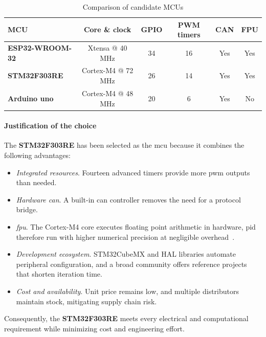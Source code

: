 \begin{table}[H]
  \centering
  \begin{tabular}{l c c c c c}
    \toprule
    \textbf{MCU}            &
    \textbf{Core \& clock}  &
    \textbf{GPIO}           &
    \textbf{PWM timers}     &
    \textbf{CAN}            &
    \textbf{FPU}                                                       \\
    \midrule
    \textbf{ESP32-WROOM-32} & Xtensa @ 40 MHz    & 34 & 16 & Yes & Yes \\
    \textbf{STM32F303RE}    & Cortex-M4 @ 72 MHz & 26 & 14 & Yes & Yes \\
    \textbf{Arduino uno}    & Cortex-M4 @ 48 MHz & 20 & 6  & Yes & No  \\
    \bottomrule
  \end{tabular}
  \caption{Comparison of candidate MCUs}
  \label{tab:mcu_comparison}
\end{table}

\paragraph*{Justification of the choice}
The \textbf{STM32F303RE} has been selected as the \gls{mcu} because it combines the following advantages:

\begin{itemize}
  \item \textit{Integrated resources}. Fourteen advanced timers provide more \gls{pwm} outputs than needed.
  \item \textit{Hardware \gls{can}}. A built-in \gls{can} controller removes the need for a protocol bridge.
  \item \textit{\gls{fpu}}. The Cortex-M4 core executes floating point arithmetic in hardware, \gls{pid} therefore run with higher numerical precision at negligible overhead~\cite{stm32f303re}.
  \item \textit{Development ecosystem}. STM32CubeMX and HAL libraries automate peripheral configuration, and a broad community offers reference projects that shorten iteration time.
  \item \textit{Cost and availability}. Unit price remains low, and multiple distributors maintain stock, mitigating supply chain risk.
\end{itemize}

Consequently, the \textbf{STM32F303RE} meets every electrical and computational requirement while minimizing cost and engineering effort.

